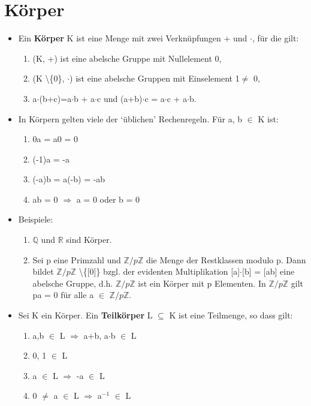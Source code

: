 \section{Körper}
\begin{itemize}
\item Ein \textbf{Körper} K ist eine Menge mit zwei Verknüpfungen + und $\cdot$, für die gilt:
\begin{enumerate}
\item (K, +) ist eine abelsche Gruppe mit Nullelement 0,
\item (K \textbackslash \{0\}, $\cdot$) ist eine abelsche Gruppen mit Einselement 1$\neq$ 0,
\item a$\cdot$(b+c)=a$\cdot$b + a$\cdot$c und (a+b)$\cdot$c = a$\cdot$c + a$\cdot$b.
\end{enumerate}
\item In Körpern gelten viele der ‘üblichen’ Rechenregeln. Für a, b $\in$ K ist:
\begin{enumerate} 
\item 0a = a0 = 0 
\item (-1)a = -a
\item (-a)b = a(-b) = -ab
\item ab = 0 $\Rightarrow$ a = 0 oder b = 0
\end{enumerate}
\item Beispiele:
\begin{enumerate}
\item $\mathbb{Q}$ und $\mathbb{R}$ sind Körper.
\item Sei p eine Primzahl und $\mathbb{Z}/p\mathbb{Z}$ die Menge der Restklassen modulo p. Dann bildet $\mathbb{Z}/p\mathbb{Z}$ \textbackslash\{[0]\} bzgl. der evidenten Multiplikation [a]$\cdot$[b] = [ab] eine abelsche Gruppe, d.h. $\mathbb{Z}/p\mathbb{Z}$ ist ein Körper mit p Elementen. In $\mathbb{Z}/p\mathbb{Z}$ gilt pa = 0 für alle a $\in$ $\mathbb{Z}/p\mathbb{Z}$.
\end{enumerate}
\item Sei K ein Körper. Ein \textbf{Teilkörper} L $\subseteq$ K ist eine Teilmenge, so dass gilt:
\begin{enumerate}
\item a,b $\in$ L $\Rightarrow$ a+b, a$\cdot$b $\in$ L
\item 0, 1 $\in$ L
\item a $\in$ L $\Rightarrow$ -a $\in$ L
\item 0 $\neq$ a $\in$ L $\Rightarrow$ a$^{-1}$ $\in$ L
\end{enumerate}
\end{itemize}

